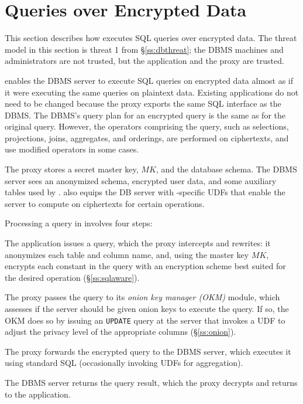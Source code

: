 
\section{Queries over Encrypted Data}
\label{s:design}


This section describes how \name{} executes SQL queries over encrypted
data.  The threat model in this section is threat 1 from
\S\ref{ss:dbthreat}; the DBMS machines and administrators are not
trusted, but the application and the proxy are trusted.

\name{} enables the DBMS server to execute SQL queries on encrypted
data almost as if it were executing the same queries on plaintext
data. Existing applications do not need to be changed because the
proxy exports the same SQL interface as the DBMS\@. The DBMS's query
plan for an encrypted query is the same as for the original query.
However, the operators comprising the query, such as selections,
projections, joins, aggregates, and orderings, are performed on
ciphertexts, and use modified operators in some cases.

The \name{} proxy stores a secret master key, $\mathit{MK}$, and the database
schema.  The DBMS server sees an anonymized schema, encrypted user
data, and some auxiliary tables used by \name{}.  \name{} also equips
the DB server with \name{}-specific UDFs that enable the server to
compute on ciphertexts for certain operations.

Processing a query in \name{} involves four steps:
\begin{CompactEnumerate}
\item The application issues a query, which the proxy intercepts and
  rewrites: it anonymizes each table and column name, and, using the
  master key $\mathit{MK}$, encrypts each constant in the query with an
  encryption scheme best suited for the desired operation
  (\S\ref{ss:sqlaware}).
\item The proxy passes the query to its {\em onion key manager (OKM)}
  module, which assesses if the server should be given onion keys to
  execute the query. If so, the OKM does so by issuing an
  \texttt{UPDATE} query at the server that invokes a UDF to adjust the
  privacy level of the appropriate columns (\S\ref{ss:onion}).
\item The proxy forwards the encrypted query to the DBMS server,
  which executes it using standard SQL (occasionally invoking 
  UDFs for aggregation).
\item The DBMS server returns the query result, which the proxy
  decrypts and returns to the application.
\end{CompactEnumerate}

